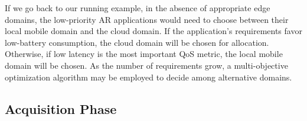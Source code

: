 


If we go back to our running example, in the absence of appropriate edge domains, the low-priority AR applications would need to choose between their local mobile domain and the cloud domain. If the application's requirements favor low-battery consumption, the cloud domain will be chosen for allocation. Otherwise, if low latency is the most important QoS metric, the local mobile domain will be chosen. As the number of requirements grow, a multi-objective optimization algorithm may be employed to decide among alternative domains.







\subsection*{Acquisition Phase}\label{sec:A3-E-acquisition}

